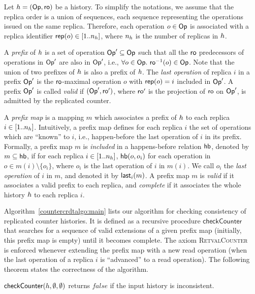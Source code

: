 Let ${h} = (\mathsf{Op}, \mathsf{ro})$ be a history.
To simplify the notations, we assume that the replica order is a union of sequences, each sequence representing the operations issued on the same replica.
Therefore, each operation $o\in \mathsf{Op}$ is associated with a replica identifier ${\sf rep}(o)\in [1..n_{h}]$, where $n_{h}$ is the number of replicas in ${h}$.

A \emph{prefix} of ${h}$ is a set of operation $\mathsf{Op}'\subseteq \mathsf{Op}$ such that all the $\mathsf{ro}$ predecessors of operations in $\mathsf{Op}'$ are also in $\mathsf{Op}'$, i.e., $\forall {o}\in \mathsf{Op}.\ \mathsf{ro}^{-1}({o})\in \mathsf{Op}$. Note that the union of two prefixes of ${h}$ is also a prefix of ${h}$. The \emph{last operation} of replica $i$ in a prefix $\mathsf{Op}'$ is the $\mathsf{ro}$-maximal operation $o$ with ${\sf rep}(o)=i$ included in $\mathsf{Op}'$.
A prefix $\mathsf{Op}'$ is called \emph{valid} if $(\mathsf{Op}',\mathsf{ro}')$, where $\mathsf{ro}'$ is the projection of $\mathsf{ro}$ on $\mathsf{Op}'$, is admitted by the replicated counter.

A \emph{prefix map} is a mapping $m$ which associates a prefix of ${h}$ to each replica $i\in [1..n_{h}]$.
Intuitively, a prefix map defines for each replica $i$ the set of operations which are ``known'' to $i$, i.e., happen-before the last operation of $i$ in its prefix. Formally, a prefix map $m$ is \emph{included} in a happens-before relation $\textsf{hb}$, denoted by $m\subseteq \textsf{hb}$, if for each replica $i\in [1..n_{h}]$, $\textsf{hb}(o,o_i)$ for each operation in $o\in m(i)\setminus\{o_i\}$, where $o_i$ is the last operation of $i$ in $m(i)$. We call $o_i$ the \emph{last operation} of $i$ in $m$, and denoted it by ${\sf last}_i(m)$.
A prefix map $m$ is \emph{valid} if it associates a valid prefix to each replica, and \emph{complete} if it associates the whole history ${h}$ to each replica $i$.

Algorithm~\ref{countercrdtalgo:main} lists our algorithm for checking consistency of replicated counter histories. It is defined as a recursive procedure $\mathsf{checkCounter}$ that searches for a sequence of valid extensions of a given prefix map (initially, this prefix map is empty) until it becomes complete. The axiom \textsc{RetvalCounter} is enforced whenever extending the prefix map with a new {\sf read} operation (when the last operation of a replica $i$ is ``advanced'' to a {\sf read} operation). The following theorem states the correctness of the algorithm.

\vspace{-2mm}
\begin{theorem}

$\mathsf{checkCounter}({h},\emptyset,\emptyset)$ returns $\mathit{false}$ if the input history is inconsistent.

\vspace{-2mm}
\end{theorem}

